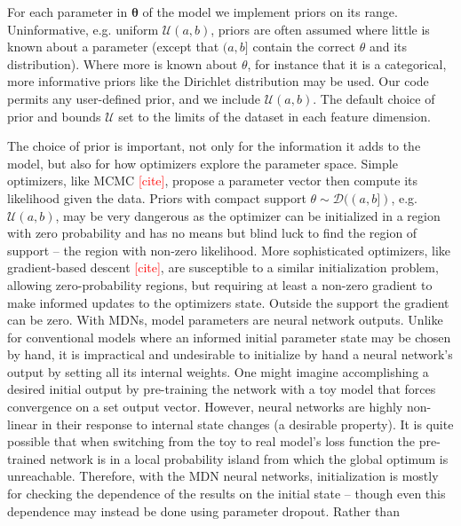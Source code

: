 \documentclass[twocolumn]{aastex631}
\newcommand{\mbs}[1]{\boldsymbol{#1}}
\newcommand{\mcal}[1]{\mathcal{#1}}
\newcommand{\TODO}[1]{{\textcolor{red}{#1}}}
\begin{document}
            For each parameter in $\mbs{\theta}$ of the model we implement priors on its range.
            Uninformative, e.g. uniform $\mcal{U}(a, b)$, priors are often assumed where little is known about a parameter (except that $(a,b]$ contain the correct $\theta$ and its distribution). Where more is known about $\theta$, for instance that it is a categorical, more informative priors like the Dirichlet distribution \citep{Bishop_Christopher_M_2016-08-23} may be used. Our code permits any user-defined prior, and we include $\mcal{U}(a, b)$.
            The default choice of prior and bounds $\mcal{U}$ set to the limits of the dataset in each feature dimension.

            The choice of prior is important, not only for the information it adds to the model, but also for how optimizers explore the parameter space. Simple optimizers, like MCMC \TODO{[cite]}, propose a parameter vector then compute its likelihood given the data. Priors with compact support  $\theta \sim \mcal{D}((a, b])$, e.g. $\mcal{U}(a, b)$, may be very dangerous as the optimizer can be initialized in a region with zero probability and has no means but blind luck to find the region of support -- the region with non-zero likelihood. More sophisticated optimizers, like gradient-based descent \TODO{[cite]}, are susceptible to a similar initialization problem, allowing zero-probability regions, but requiring at least a non-zero gradient to make informed updates to the optimizers state. Outside the  support the gradient can be zero.
            With MDNs, model parameters are neural network outputs. Unlike for conventional models where an informed initial parameter state may be chosen by hand, it is impractical and undesirable to initialize by hand a neural network's output by setting all its internal weights. One might imagine accomplishing a desired initial output by pre-training the network with a toy model that forces convergence on a set output vector. However,
            neural networks are highly non-linear in their response to internal state changes (a desirable property). It is quite possible that when switching from the toy to real model's loss function the pre-trained network is in 
            a local probability island from which the global optimum is unreachable.  
            Therefore, with the MDN neural networks, initialization is mostly for checking the dependence of the results on the initial state -- though even this dependence may instead be done using parameter dropout. Rather than 
\end{document}
